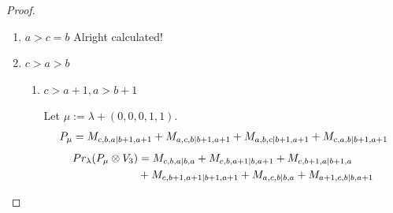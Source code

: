 \begin{proof}
\begin{enumerate}
\begin{enumerate}
        \item $c>b+1$ \par
        Let $\mu:=\lambda + (1,1,0,0,0) $.
        \begin{equation}\notag
          \begin{aligned}
            P_\mu = M_{c+2,b+1,c|b,c+1}
+ M_{c+2,c,b+1|b,c+1}
          \end{aligned}
        \end{equation}
        \begin{equation}\notag
          \begin{aligned}
            Pr_{\lambda}(P_\mu \otimes V_{4}) &=
M_{c+2,b+1,c|b+1,c+2}
+ M_{c+1,b+1,c|b+1,c+1}
+ M_{c+2,b,c|b,c+2}\\
                                              &
+ M_{c+1,b,c|b,c+1}
+ M_{c+2,c,b+1|b+1,c+2}
+ M_{c+1,c,b+1|b+1,c+1}\\
                                              &
+ M_{c+2,c,b|b,c+2}
+ M_{c+1,c,b|b,c+1} \\
                                               &=
\sum M_{c+1,b,c|b,c+1}
+ \sum M_{c+1,b+1,c|b+1,c+1}\\
                                              &
+ \sum M_{c+2,b,c|b,c+2}
+ \sum M_{c+2,b+1,c|b+1,c+2}
          \end{aligned}
        \end{equation}
      \end{enumerate}
    \item $a>c=b$ Alright calculated!
    \item $c>a>b$
      \begin{enumerate}
        \item $c>a+1,a>b+1$ \par
        Let $\mu:=\lambda + (0,0,0,1,1) $.
        \begin{equation}\notag
          \begin{aligned}
            P_\mu = M_{c,b,a|b+1,a+1}
+ M_{a,c,b|b+1,a+1}
+ M_{a,b,c|b+1,a+1}
+ M_{c,a,b|b+1,a+1}
          \end{aligned}
        \end{equation}
        \begin{equation}\notag
          \begin{aligned}
            Pr_{\lambda}(P_\mu \otimes V_{3}) &=
M_{c,b,a|b,a}
+ M_{c,b,a+1|b,a+1}
+ M_{c,b+1,a|b+1,a}\\
                                              &
+ M_{c,b+1,a+1|b+1,a+1}
+ M_{a,c,b|b,a}
+ M_{a+1,c,b|b,a+1}\\

\end{aligned}
\end{equation}
\end{enumerate}
\end{enumerate}
\end{proof}

